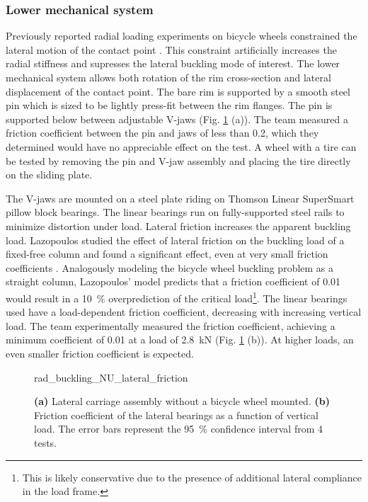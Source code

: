 \documentclass[\rootdir/thesis.tex]{subfiles}
\begin{document}
\subsubsection*{Lower mechanical system}
Previously reported radial loading experiments on bicycle wheels constrained the lateral motion of the contact point \cite{Burgoyne1993,RARblog,McLundie2007}. This constraint artificially increases the radial stiffness and supresses the lateral buckling mode of interest. The lower mechanical system allows both rotation of the rim cross-section and lateral displacement of the contact point. The bare rim is supported by a smooth steel pin which is sized to be lightly press-fit between the rim flanges. The pin is supported below between adjustable V-jaws (Fig. \ref{fig:rad_buckling_NU_lateral_friction} (a)). The team measured a friction coefficient between the pin and jaws of less than 0.2, which they determined would have no appreciable effect on the test. A wheel with a tire can be tested by removing the pin and V-jaw assembly and placing the tire directly on the sliding plate.

The V-jaws are mounted on a steel plate riding on Thomson Linear SuperSmart pillow block bearings. The linear bearings run on fully-supported steel rails to minimize distortion under load. Lateral friction increases the apparent buckling load. Lazopoulos studied the effect of lateral friction on the buckling load of a fixed-free column and found a significant effect, even at very small friction coefficients \cite{Lazopoulos1991}. Analogously modeling the bicycle wheel buckling problem as a straight column, Lazopoulos' model predicts that a friction coefficient of 0.01 would result in a \SI{10}{\percent} overprediction of the critical load\footnote{This is likely conservative due to the presence of additional lateral compliance in the load frame.}. The linear bearings used have a load-dependent friction coefficient, decreasing with increasing vertical load. The team experimentally measured the friction coefficient, achieving a minimum coefficient of 0.01 at a load of \SI{2.8}{\kilo\newton} (Fig. \ref{fig:rad_buckling_NU_lateral_friction} (b)). At higher loads, an even smaller friction coefficient is expected.

\begin{figure}[t]
\centering
{rad_buckling_NU_lateral_friction}
\caption{\textbf{(a)} Lateral carriage assembly without a bicycle wheel mounted. \textbf{(b)} Friction coefficient of the lateral bearings as a function of vertical load. The error bars represent the \SI{95}{\percent} confidence interval from 4 tests.}
\label{fig:rad_buckling_NU_lateral_friction}
\end{figure}
\end{document}
